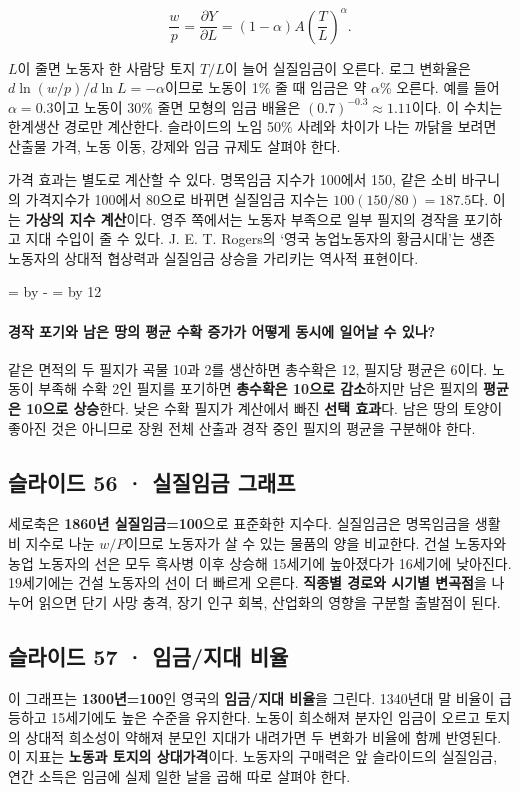 \documentclass[10pt,a4paper]{article}
\newcommand{\ReserveQuestionSpace}{%
  \par\begingroup
  \dimen0=\pagegoal \advance\dimen0 by -\pagetotal
  \dimen2=\baselineskip \multiply\dimen2 by 12
  \ifdim\dimen0<\dimen2 \newpage\fi
  \endgroup}
\begin{document}
\[
\frac{w}{p}=\frac{\partial Y}{\partial L}
=(1-\alpha)A\left(\frac{T}{L}\right)^\alpha.
\]

$L$이 줄면 노동자 한 사람당 토지 $T/L$이 늘어 실질임금이 오른다. 로그 변화율은 $d\ln(w/p)/d\ln L=-\alpha$이므로 노동이 1\% 줄 때 임금은 약 $\alpha$\% 오른다. 예를 들어 $\alpha=0.3$이고 노동이 30\% 줄면 모형의 임금 배율은 $(0.7)^{-0.3}\approx1.11$이다. 이 수치는 한계생산 경로만 계산한다. 슬라이드의 노임 50\% 사례와 차이가 나는 까닭을 보려면 산출물 가격, 노동 이동, 강제와 임금 규제도 살펴야 한다.\par

가격 효과는 별도로 계산할 수 있다. 명목임금 지수가 100에서 150, 같은 소비 바구니의 가격지수가 100에서 80으로 바뀌면 실질임금 지수는 $100(150/80)=187.5$다. 이는 \textbf{가상의 지수 계산}이다. 영주 쪽에서는 노동자 부족으로 일부 필지의 경작을 포기하고 지대 수입이 줄 수 있다. J. E. T. Rogers의 ‘영국 농업노동자의 황금시대’는 생존 노동자의 상대적 협상력과 실질임금 상승을 가리키는 역사적 표현이다.\par

\ReserveQuestionSpace
\paragraph{경작 포기와 남은 땅의 평균 수확 증가가 어떻게 동시에 일어날 수 있나?}
같은 면적의 두 필지가 곡물 10과 2를 생산하면 총수확은 12, 필지당 평균은 6이다. 노동이 부족해 수확 2인 필지를 포기하면 \textbf{총수확은 10으로 감소}하지만 남은 필지의 \textbf{평균은 10으로 상승}한다. 낮은 수확 필지가 계산에서 빠진 \textbf{선택 효과}다. 남은 땅의 토양이 좋아진 것은 아니므로 장원 전체 산출과 경작 중인 필지의 평균을 구분해야 한다.\par

\subsection{슬라이드 56 · 실질임금 그래프}
세로축은 \textbf{1860년 실질임금=100}으로 표준화한 지수다. 실질임금은 명목임금을 생활비 지수로 나눈 $w/P$이므로 노동자가 살 수 있는 물품의 양을 비교한다. 건설 노동자와 농업 노동자의 선은 모두 흑사병 이후 상승해 15세기에 높아졌다가 16세기에 낮아진다. 19세기에는 건설 노동자의 선이 더 빠르게 오른다. \textbf{직종별 경로와 시기별 변곡점}을 나누어 읽으면 단기 사망 충격, 장기 인구 회복, 산업화의 영향을 구분할 출발점이 된다.\par

\subsection{슬라이드 57 · 임금/지대 비율}
이 그래프는 \textbf{1300년=100}인 영국의 \textbf{임금/지대 비율}을 그린다. 1340년대 말 비율이 급등하고 15세기에도 높은 수준을 유지한다. 노동이 희소해져 분자인 임금이 오르고 토지의 상대적 희소성이 약해져 분모인 지대가 내려가면 두 변화가 비율에 함께 반영된다. 이 지표는 \textbf{노동과 토지의 상대가격}이다. 노동자의 구매력은 앞 슬라이드의 실질임금, 연간 소득은 임금에 실제 일한 날을 곱해 따로 살펴야 한다.\par
\end{document}
